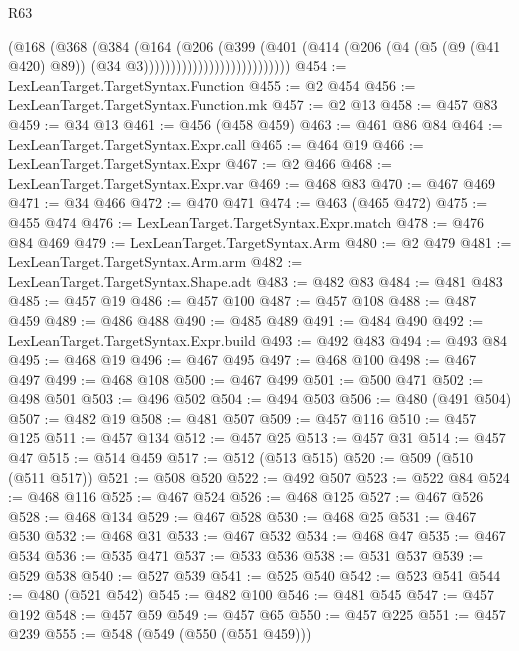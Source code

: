 \begin{lexlean}{R63}
\begin{coremodule}
                                    (@168
                                      (@368
                                        (@384
                                          (@164
                                            (@206
                                              (@399
                                                (@401
                                                  (@414
                                                    (@206
                                                      (@4
                                                        (@5 (@9 (@41 @420) @89))
                                                        (@34 @3)))))))))))))))))))))))))))
@454 := LexLeanTarget.TargetSyntax.Function
@455 := @2 @454
@456 := LexLeanTarget.TargetSyntax.Function.mk
@457 := @2 @13
@458 := @457 @83
@459 := @34 @13
@461 := @456 (@458 @459)
@463 := @461 @86 @84
@464 := LexLeanTarget.TargetSyntax.Expr.call
@465 := @464 @19
@466 := LexLeanTarget.TargetSyntax.Expr
@467 := @2 @466
@468 := LexLeanTarget.TargetSyntax.Expr.var
@469 := @468 @83
@470 := @467 @469
@471 := @34 @466
@472 := @470 @471
@474 := @463 (@465 @472)
@475 := @455 @474
@476 := LexLeanTarget.TargetSyntax.Expr.match
@478 := @476 @84 @469
@479 := LexLeanTarget.TargetSyntax.Arm
@480 := @2 @479
@481 := LexLeanTarget.TargetSyntax.Arm.arm
@482 := LexLeanTarget.TargetSyntax.Shape.adt
@483 := @482 @83
@484 := @481 @483
@485 := @457 @19
@486 := @457 @100
@487 := @457 @108
@488 := @487 @459
@489 := @486 @488
@490 := @485 @489
@491 := @484 @490
@492 := LexLeanTarget.TargetSyntax.Expr.build
@493 := @492 @483
@494 := @493 @84
@495 := @468 @19
@496 := @467 @495
@497 := @468 @100
@498 := @467 @497
@499 := @468 @108
@500 := @467 @499
@501 := @500 @471
@502 := @498 @501
@503 := @496 @502
@504 := @494 @503
@506 := @480 (@491 @504)
@507 := @482 @19
@508 := @481 @507
@509 := @457 @116
@510 := @457 @125
@511 := @457 @134
@512 := @457 @25
@513 := @457 @31
@514 := @457 @47
@515 := @514 @459
@517 := @512 (@513 @515)
@520 := @509 (@510 (@511 @517))
@521 := @508 @520
@522 := @492 @507
@523 := @522 @84
@524 := @468 @116
@525 := @467 @524
@526 := @468 @125
@527 := @467 @526
@528 := @468 @134
@529 := @467 @528
@530 := @468 @25
@531 := @467 @530
@532 := @468 @31
@533 := @467 @532
@534 := @468 @47
@535 := @467 @534
@536 := @535 @471
@537 := @533 @536
@538 := @531 @537
@539 := @529 @538
@540 := @527 @539
@541 := @525 @540
@542 := @523 @541
@544 := @480 (@521 @542)
@545 := @482 @100
@546 := @481 @545
@547 := @457 @192
@548 := @457 @59
@549 := @457 @65
@550 := @457 @225
@551 := @457 @239
@555 := @548 (@549 (@550 (@551 @459)))

\end{coremodule}
\end{lexlean}
